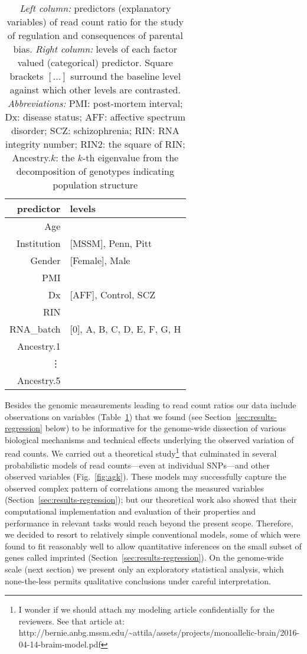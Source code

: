 \documentclass[letterpaper]{article}
\begin{document}
\begin{table}
\begin{center}
\begin{tabular}{r|l}
predictor & levels\\
\hline
Age &  \\
Institution & [MSSM], Penn, Pitt\\
Gender & [Female], Male\\
PMI & \\
Dx & [AFF], Control, SCZ\\
RIN &  \\
RNA\_batch & [0], A, B, C, D, E, F, G, H\\
Ancestry.1 & \\
\vdots & \\
Ancestry.5 &  \\
\end{tabular}
\caption{ \emph{Left column:} predictors (explanatory variables) of read count ratio for the study of
regulation and consequences of parental bias.  \emph{Right column:} levels of
each factor valued (categorical) predictor.  Square brackets \([...]\) surround the baseline
level against which other levels are contrasted.  \emph{Abbreviations:} PMI: post-mortem interval; Dx:
disease status; AFF: affective spectrum disorder; SCZ: schizophrenia; RIN: RNA
integrity number; RIN2: the square of RIN; Ancestry.\(k\): the \(k\)-th
eigenvalue from the decomposition of genotypes indicating population structure}
\label{tab:predictors}
\end{center}
\end{table}

Besides the genomic measurements leading to read count ratios our data include
observations on variables (Table~\ref{tab:predictors}) that we found (see
Section~\ref{sec:results-regression} below) to be informative for the genome-wide
dissection of various biological mechanisms and technical effects underlying
the observed variation of read counts.  We carried out a theoretical
study\footnote{I wonder if we should attach my modeling article confidentially
for the reviewers.  See that article
at:\\http://bernie.anbg.mssm.edu/\~{}attila/assets/projects/monoallelic-brain/2016-04-14-braim-model.pdf}
that culminated in several probabilistic models of read counts---even at
individual SNPs---and other observed variables (Fig.~\ref{fig:agk}).  These
models may successfully capture the observed complex pattern of correlations
among the measured variables (Section~\ref{sec:results-regression}); but our
theoretical work also showed that their computational implementation and
evaluation of their properties and performance in relevant tasks would reach
beyond the present scope.  Therefore, we decided to resort to relatively
simple conventional models, some of which were found to fit reasonably well to
allow quantitative inferences on the small subset of genes called imprinted
(Section~\ref{sec:results-regression}).  On the genome-wide scale (next section) we
present only an exploratory statistical analysis, which none-the-less permits
qualitative conclusions under careful interpretation.
\end{document}
